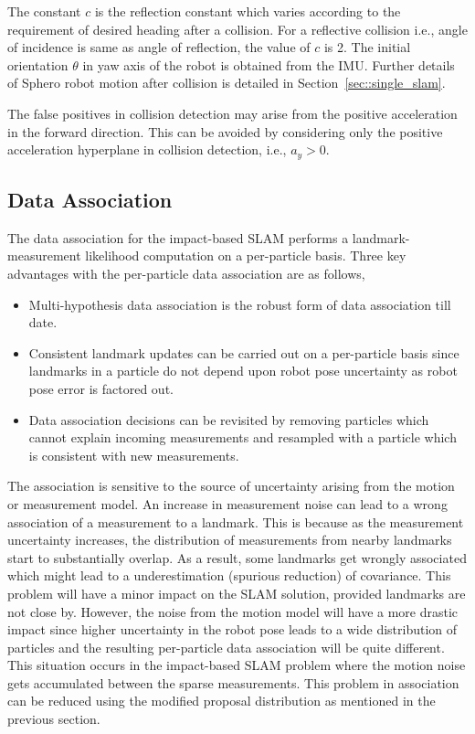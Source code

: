 The constant $c$ is the reflection constant which varies according to the requirement of desired heading after a collision. For a reflective collision i.e., angle of incidence is same as angle of reflection, the value of $c$ is 2. The initial orientation $\theta$ in yaw axis of the robot is obtained from the IMU. Further details of Sphero robot motion after collision is detailed in Section~\ref{sec::single_slam}.  

\begin{rem}
The false positives in collision detection may arise from the positive acceleration in the forward direction. This can be avoided by considering only the positive acceleration hyperplane in collision detection, i.e., $a_y>0$.
\end{rem}

\subsection{Data Association}
The data association for the impact-based SLAM performs a landmark-measurement likelihood computation on a per-particle basis. Three key advantages with the per-particle data association are as follows,
\begin{itemize}
\item Multi-hypothesis data association is the robust form of data association till date.
\item Consistent landmark updates can be carried out on a per-particle basis since landmarks in a particle do not depend upon robot pose uncertainty as robot pose error is factored out.
\item Data association decisions can be revisited by removing particles which cannot explain incoming measurements and resampled with a particle which is consistent with new measurements. 
\end{itemize}

The association is sensitive to the source of uncertainty arising from the motion or measurement model. An increase in measurement noise can lead to a wrong association of a measurement to a landmark. This is because as the measurement uncertainty increases, the distribution of measurements from nearby landmarks start to substantially overlap. As a result, some landmarks get wrongly associated which might lead to a underestimation (spurious reduction) of covariance. This problem will have a minor impact on the SLAM solution, provided landmarks are not close by. However, the noise from the motion model will have a more drastic impact since higher uncertainty in the robot pose leads to a wide distribution of particles and the resulting per-particle data association will be quite different. This situation occurs in the impact-based SLAM problem where the motion noise gets accumulated between the sparse measurements. This problem in association can be reduced using the modified proposal distribution as mentioned in the previous section. 

